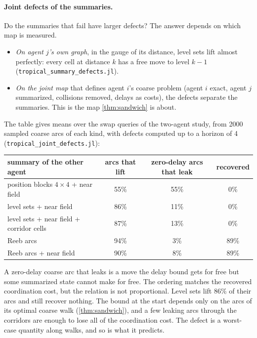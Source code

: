 \documentclass[11pt]{article}
\theoremstyle{definition}
\theoremstyle{remark}
\begin{document}
\paragraph{Joint defects of the summaries.}
Do the summaries that fail have larger defects? The answer depends on which map is
measured.
\begin{itemize}[nosep]
\item \emph{On agent $j$'s own graph}, in the gauge of its distance, level sets lift
  almost perfectly: every cell at distance $k$ has a free move to level $k-1$
  (\texttt{tropical\_summary\_defects.jl}).
\item \emph{On the joint map} that defines agent $i$'s coarse problem (agent $i$
  exact, agent $j$ summarized, collisions removed, delays as costs), the defects
  separate the summaries. This is the map \cref{thm:sandwich} is about.
\end{itemize}
The table gives means over the swap queries of the two-agent study, from 2000
sampled coarse arcs of each kind, with defects computed up to a horizon of 4
(\texttt{tropical\_joint\_defects.jl}):

\begin{center}
\small
\begin{tabular}{lccc}
\toprule
summary of the other agent & arcs that lift & zero-delay arcs that leak & recovered \\
\midrule
position blocks $4\times4$ + near field & 55\% & 55\% & 0\% \\
level sets + near field & 86\% & 11\% & 0\% \\
level sets + near field + corridor cells & 87\% & 13\% & 0\% \\
Reeb arcs & 94\% & 3\% & 89\% \\
Reeb arcs + near field & 90\% & 8\% & 89\% \\
\bottomrule
\end{tabular}
\end{center}

A zero-delay coarse arc that leaks is a move the delay bound gets for free but
some summarized state cannot make for free. The ordering matches the recovered
coordination cost, but the relation is not proportional. Level sets lift 86\% of
their arcs and still recover nothing. The bound at the start depends only on the
arcs of its optimal coarse walk (\cref{thm:sandwich}), and a few leaking arcs
through the corridors are enough to lose all of the coordination cost. The defect
is a worst-case quantity along walks, and so is what it predicts.
\end{document}
